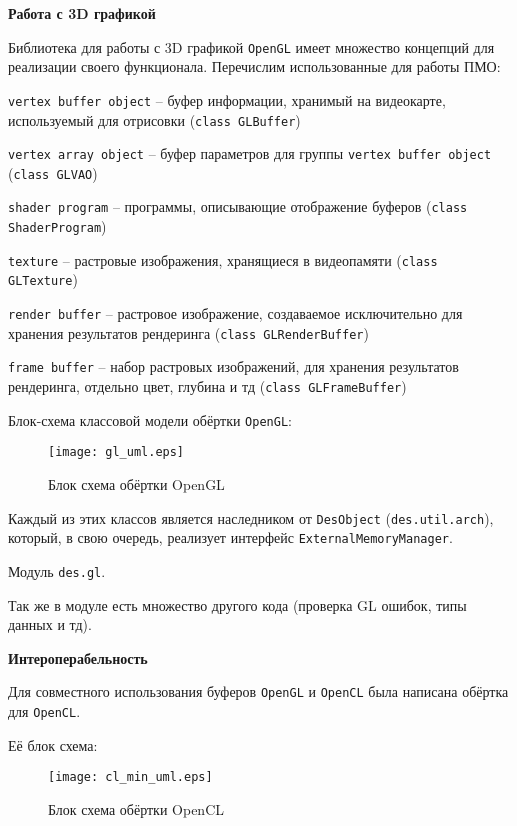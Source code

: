 \newpage
\textbf{Работа с 3D графикой}

Библиотека для работы с 3D графикой \verb|OpenGL| имеет множество концепций для реализации
своего функционала. Перечислим использованные для работы ПМО:

\begin{mintemize}
\item \verb|vertex buffer object| -- буфер информации,
    хранимый на видеокарте, используемый для отрисовки
    (\verb|class GLBuffer|)
\item \verb|vertex array object| -- буфер параметров для
    группы \verb|vertex buffer object| (\verb|class GLVAO|)
\item \verb|shader program| -- программы, описывающие
    отображение буферов \linebreak (\verb|class ShaderProgram|)
\item \verb|texture| -- растровые изображения, хранящиеся
    в видеопамяти (\verb|class GLTexture|)
\item \verb|render buffer| -- растровое изображение, создаваемое
    исключительно для хранения результатов рендеринга
    (\verb|class GLRenderBuffer|)
\item \verb|frame buffer| -- набор растровых изображений,
    для хранения результатов рендеринга, отдельно цвет,
    глубина и тд (\verb|class GLFrameBuffer|)
\end{mintemize}

Блок-схема классовой модели обёртки \verb|OpenGL|:

\begin{figure}[h!]
    \centering
    \texttt{[image: gl\_uml.eps]}
    \caption{Блок схема обёртки OpenGL}
\end{figure}

Каждый из этих классов является наследником от \verb|DesObject|
(\verb|des.util.arch|), который, в свою очередь, реализует интерфейс
\verb|ExternalMemoryManager|.

Модуль \verb|des.gl|.

Так же в модуле есть множество другого кода (проверка GL ошибок,
типы данных и тд).

\newpage
\textbf{Интероперабельность}

Для совместного использования буферов \verb|OpenGL| и \verb|OpenCL|
была написана обёртка для \verb|OpenCL|.

Её блок схема:

\begin{figure}[h!]
    \centering
    \texttt{[image: cl\_min\_uml.eps]}
    \caption{Блок схема обёртки OpenCL}
\end{figure}


